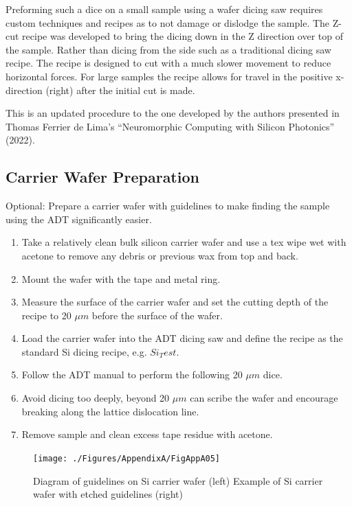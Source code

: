 \qquad Preforming such a dice on a small sample using a wafer dicing saw requires custom techniques and recipes as to not damage or dislodge the sample. The Z-cut recipe was developed to bring the dicing down in the Z direction over top of the sample. Rather than dicing from the side such as a traditional dicing saw recipe. The recipe is designed to cut with a much slower movement to reduce horizontal forces. For large samples the recipe allows for travel in the positive x-direction (right) after the initial cut is made. 

\qquad This is an updated procedure to the one developed by the authors presented in Thomas Ferrier de Lima’s  “Neuromorphic Computing with Silicon Photonics” (2022)\cite{deLimaThesis}.

\subsection{Carrier Wafer Preparation}
Optional: Prepare a carrier wafer with guidelines to make finding the sample using the ADT significantly easier. 

\begin{enumerate}
    \item Take a relatively clean bulk silicon carrier wafer and use a tex wipe wet with acetone to remove any debris or previous wax from top and back.
    \item Mount the wafer with the tape and metal ring.
    \item Measure the surface of the carrier wafer and set the cutting depth of the recipe to 20 $\mu m$ before the surface of the wafer.
    \item Load the carrier wafer into the ADT dicing saw and define the recipe as the standard Si dicing recipe, e.g. $Si_Test$.
    \item Follow the ADT manual to perform the following 20 $\mu m$ dice.
    \item Avoid dicing too deeply, beyond 20 $\mu m$ can scribe the wafer and encourage breaking along the lattice dislocation line.
    \item Remove sample and clean excess tape residue with acetone.
\end{enumerate}

\begin{figure}[!ht]
\centering
\texttt{[image: ./Figures/AppendixA/FigAppA05]}
\caption[Diagram of guidelines on Si carrier wafer. Example of Si carrier wafer with etched guidelines.]{Diagram of guidelines on Si carrier wafer (left) Example of Si carrier wafer with etched guidelines (right)}
\label{FigAppA5}
\end{figure}

